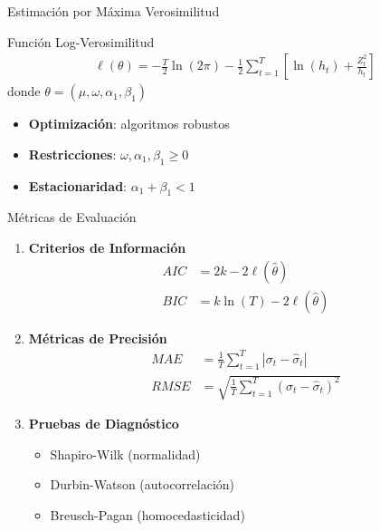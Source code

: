 \begin{frame}{Estimación por Máxima Verosimilitud}
    \begin{block}{Función Log-Verosimilitud}
        \begin{align}
            \ell(\theta) = -\frac{T}{2}\ln(2\pi) - \frac{1}{2}\sum_{t=1}^{T}\left[\ln(h_t) + \frac{Z_t^2}{h_t}\right]
        \end{align}
        donde $\theta = (\mu, \omega, \alpha_1, \beta_1)$
    \end{block}
    
    \vspace{0.5em}
    
    \begin{itemize}
        \item<2-> \textbf{Optimización}: algoritmos robustos
        \item<3-> \textbf{Restricciones}: $\omega, \alpha_1, \beta_1 \geq 0$
        \item<4-> \textbf{Estacionaridad}: $\alpha_1 + \beta_1 < 1$
    \end{itemize}
\end{frame}

\begin{frame}{Métricas de Evaluación}
    \begin{enumerate}
        \item<1-> \textbf{Criterios de Información}
        \begin{align}
            AIC &= 2k - 2\ell(\hat{\theta})\\
            BIC &= k\ln(T) - 2\ell(\hat{\theta})
        \end{align}
        
        \item<2-> \textbf{Métricas de Precisión}
        \begin{align}
            MAE &= \frac{1}{T}\sum_{t=1}^{T}|\sigma_{t} - \hat{\sigma}_t|\\
            RMSE &= \sqrt{\frac{1}{T}\sum_{t=1}^{T}(\sigma_{t} - \hat{\sigma}_t)^2}
        \end{align}
        
        \item<3-> \textbf{Pruebas de Diagnóstico}
        \begin{itemize}
            \item Shapiro-Wilk (normalidad)
            \item Durbin-Watson (autocorrelación)
            \item Breusch-Pagan (homocedasticidad)
        \end{itemize}
    \end{enumerate}
\end{frame}